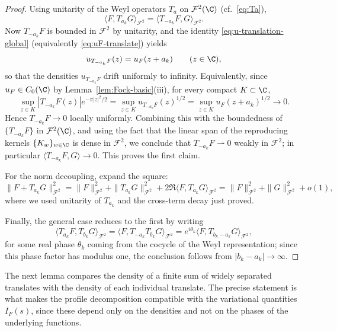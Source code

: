 \begin{proof}
Using unitarity of the Weyl operators \(T_a\) on \(\mathcal F^2(\C)\) (cf.\
\eqref{eq:Ta}),
\[
\langle F,T_{a_k}G\rangle_{\mathcal F^2}
=
\langle T_{-a_k}F,G\rangle_{\mathcal F^2}.
\]
Now \(T_{-a_k}F\) is bounded in \(\mathcal F^2\) by unitarity, and the
identity \eqref{eq:u-translation-global} (equivalently
\eqref{eq:uF-translate}) yields
\[
u_{T_{-a_k}F}(z)=u_F(z+a_k)\qquad (z\in\C),
\]
so that the densities \(u_{T_{-a_k}F}\) drift uniformly to infinity.
Equivalently, since \(u_F\in C_0(\C)\) by Lemma~\ref{lem:Fock-basic}(iii), for
every compact \(K\subset \C\),
\[
\sup_{z\in K}|T_{-a_k}F(z)|e^{-\pi |z|^2/2}
=
\sup_{z\in K}u_{T_{-a_k}F}(z)^{1/2}
=
\sup_{z\in K}u_F(z+a_k)^{1/2}\to 0.
\]
Hence \(T_{-a_k}F\to 0\) locally uniformly. Combining this with the
boundedness of \(\{T_{-a_k}F\}\) in \(\mathcal F^2(\C)\), and using the fact
that the linear span of the reproducing kernels \(\{K_w\}_{w\in\C}\) is dense
in \(\mathcal F^2\), we conclude that \(T_{-a_k}F\rightharpoonup 0\) weakly in
\(\mathcal F^2\); in particular \(\langle T_{-a_k}F,G\rangle\to 0\). This
proves the first claim.

For the norm decoupling, expand the square:
\[
\|F+T_{a_k}G\|_{\mathcal F^2}^2
=
\|F\|_{\mathcal F^2}^2+\|T_{a_k}G\|_{\mathcal F^2}^2
+2\Re\langle F,T_{a_k}G\rangle_{\mathcal F^2}
=
\|F\|_{\mathcal F^2}^2+\|G\|_{\mathcal F^2}^2+o(1),
\]
where we used unitarity of \(T_{a_k}\) and the cross-term decay just proved.

Finally, the general case reduces to the first by writing
\[
\langle T_{a_k}F,T_{b_k}G\rangle_{\mathcal F^2}
=
\langle F,T_{-a_k}T_{b_k}G\rangle_{\mathcal F^2}
=
e^{i\theta_k}\langle F,T_{b_k-a_k}G\rangle_{\mathcal F^2},
\]
for some real phase \(\theta_k\) coming from the cocycle of the Weyl
representation; since this phase factor has modulus one, the conclusion
follows from \(|b_k-a_k|\to\infty\).
\end{proof}

The next lemma compares the density of a finite sum of widely separated
translates with the density of each individual translate. The precise statement
is what makes the profile decomposition compatible with the variational
quantities \(I_F(s)\), since these depend only on the densities and not on
the phases of the underlying functions.

